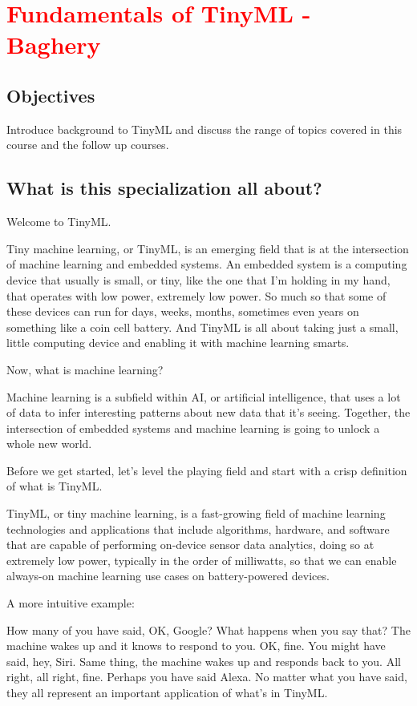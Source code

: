 \chapter{\textcolor{red}{Fundamentals of TinyML - Baghery}}

\section{Objectives}

Introduce background to TinyML and discuss the range of topics covered in this course and the follow up courses.

\section{What is this specialization all about?}

Welcome to TinyML.

Tiny machine learning, or TinyML, is an emerging field that is at the intersection of machine learning and embedded systems.
An embedded system is a computing device that usually is small, or tiny, like the one that I'm holding in my hand, that operates with low power, extremely low power.
So much so that some of these devices can run for days, weeks, months, sometimes even years on something like a coin cell battery.
And TinyML is all about taking just a small, little computing device and enabling it with machine learning smarts.

Now, what is machine learning?

Machine learning is a subfield within AI, or artificial intelligence, that uses a lot of data to infer interesting patterns about new data that it's seeing.
Together, the intersection of embedded systems and machine learning is going to unlock a whole new world.



Before we get started, let's level the playing field and start with a crisp definition of what is TinyML.

TinyML, or tiny machine learning, is a fast-growing field of machine learning technologies and applications that include algorithms, hardware, and software that are capable of performing on-device sensor data analytics, doing so at extremely low power, typically in the order of milliwatts, so that we can enable always-on machine learning use cases on battery-powered devices.

A more intuitive example:

How many of you have said, OK, Google?
What happens when you say that?
The machine wakes up and it knows to respond to you.
OK, fine.
You might have said, hey, Siri.
Same thing, the machine wakes up and responds back to you.
All right, all right, fine.
Perhaps you have said Alexa.
No matter what you have said, they all represent an important application of what's in TinyML.


